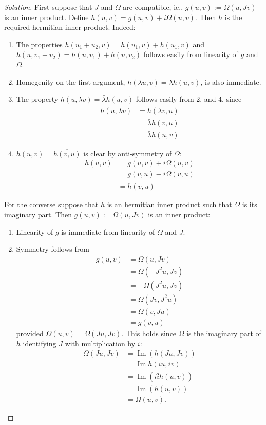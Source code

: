 \begin{proof}[Solution]\leavevmode
	First suppose that $J$ and $\Omega$ are compatible, ie., $g(u,v):=\Omega(u,Jv)$ is an inner product. Define $h(u,v)=g(u,v)+i\Omega(u,v)$. Then  $h$ is the required hermitian inner product. Indeed:

	\begin{enumerate}
		\item The properties $h(u_1+u_2,v)=h(u_1,v)+h(u_1,v)$ and  $h(u,v_1+v_2)=h(u,v_1)+h(u,v_2)$ follows easily from linearity of $g$ and $\Omega$.
		
		\item Homegenity on the first argument, $h(\lambda u,v)=\lambda h(u,v)$, is also immediate.

		\item The property $h(u,\lambda v)=\bar{\lambda} h(u,v)$ follows easily from 2. and 4. since 
			\begin{align*}
				h(u,\lambda v)& =\overline{h(\lambda v, u)}\\
				& =\bar{\lambda} \overline{h(v,u)}\\
				& =\bar{\lambda} h(u,v)
			\end{align*}

		\item $h(u,v)=\overline{h(v,u)}$ is clear by anti-symmetry of $\Omega$:
			\begin{align*}
				h(u,v)& =g(u,v)+i\Omega(u,v)\\
				& =g(v,u)-i\Omega(v,u)\\
				& =\overline{h(v,u)}
			\end{align*}
	\end{enumerate}
	For the converse suppose that $h$ is an hermitian inner product such that $\Omega$ is its imaginary part. Then $g(u,v):=\Omega(u,Jv)$ is an inner product:
	\begin{enumerate}
		\item Linearity of $g$ is immediate from linearity of $\Omega$ and $J$.

		\item Symmetry follows from 
			 \begin{align*}
				g(u,v)&=\Omega(u,Jv)\\
				&=\Omega(-J^{2} u,Jv)\\
				& =-\Omega(J^{2} u,Jv)\\
				& =\Omega(Jv,J^{2} u)\\
				&=\Omega(v,Ju)\\
				&=g(v,u)
			\end{align*}
		provided $\Omega(u,v)=\Omega(Ju,Jv)$. This holds since $\Omega$ is the imaginary part of $h$ identifying $J$ with multiplication by $i$:
			\begin{align*}
				\Omega(Ju,Jv)&=\operatorname{Im}(h (Ju,Jv))\\
				& =\operatorname{Im}h(iu,iv)\\
				&=\operatorname{Im}(i\bar{i}h(u,v))\\
				&=\operatorname{Im}(h(u,v))\\
				&=\Omega(u,v).
			\end{align*}


\end{enumerate}
\end{proof}
